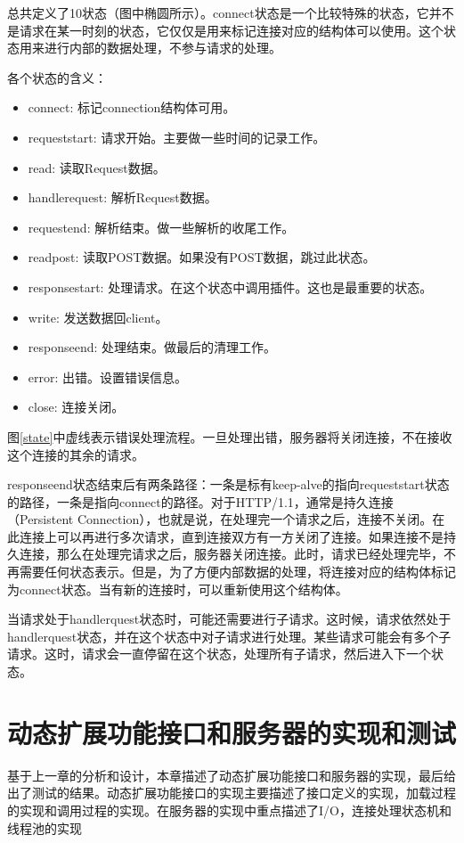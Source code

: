 \documentclass[12pt, twoside, a4paper, xetex]{report}
\begin{document}
	总共定义了10状态（图中椭圆所示）。connect状态是一个比较特殊的状态，它并不是请求在某一时刻的状态，它仅仅是用来标记连接对应的结构体可以使用。这个状态用来进行内部的数据处理，不参与请求的处理。
	
	各个状态的含义：
	\begin{itemize}
		\item connect: 标记connection结构体可用。
		\item requeststart: 请求开始。主要做一些时间的记录工作。
		\item read: 读取Request数据。
		\item handlerequest: 解析Request数据。
		\item requestend: 解析结束。做一些解析的收尾工作。
		\item readpost: 读取POST数据。如果没有POST数据，跳过此状态。
		\item responsestart: 处理请求。在这个状态中调用插件。这也是最重要的状态。
		\item write: 发送数据回client。
		\item responseend: 处理结束。做最后的清理工作。
		\item error: 出错。设置错误信息。
		\item close: 连接关闭。
	\end{itemize}
	
	图\ref{state}中虚线表示错误处理流程。一旦处理出错，服务器将关闭连接，不在接收这个连接的其余的请求。
	
	responseend状态结束后有两条路径：一条是标有keep-alve的指向requeststart状态的路径，一条是指向connect的路径。对于HTTP/1.1，通常是持久连接（Persistent Connection），也就是说，在处理完一个请求之后，连接不关闭。在此连接上可以再进行多次请求，直到连接双方有一方关闭了连接。如果连接不是持久连接，那么在处理完请求之后，服务器关闭连接。此时，请求已经处理完毕，不再需要任何状态表示。但是，为了方便内部数据的处理，将连接对应的结构体标记为connect状态。当有新的连接时，可以重新使用这个结构体。
	
	当请求处于handlerquest状态时，可能还需要进行子请求。这时候，请求依然处于handlerquest状态，并在这个状态中对子请求进行处理。某些请求可能会有多个子请求。这时，请求会一直停留在这个状态，处理所有子请求，然后进入下一个状态。
	
\chapter{动态扩展功能接口和服务器的实现和测试}

	基于上一章的分析和设计，本章描述了动态扩展功能接口和服务器的实现，最后给出了测试的结果。动态扩展功能接口的实现主要描述了接口定义的实现，加载过程的实现和调用过程的实现。在服务器的实现中重点描述了I/O，连接处理状态机和线程池的实现
\end{document}
